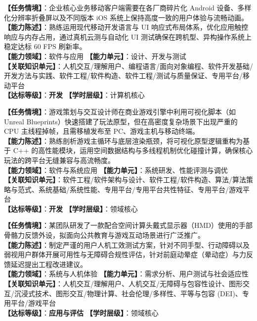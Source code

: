 \begin{taskbox}[任务 2：高一致性多端自适应移动应用设计与实现]
\textbf{【任务情境】}：企业核心业务移动客户端需要在各厂商碎片化 Android 设备、多样化分辨率折叠屏以及不同版本 iOS 系统上保持高度一致的用户体验与流畅动画。\\
\textbf{【能力陈述】}：熟练运用现代移动开发语言与 UI 响应式布局体系，优化应用触控响应与内存占用，通过真机云测与自动化 UI 测试确保在跨机型、异构操作系统上稳定达标 60 FPS 刷新率。\\
\textbf{【能力领域】}：软件与应用 \quad \textbf{【能力单元】}：设计、开发与测试\\
\textbf{【关联知识单元】}：人机交互/理解用户、编程语言/面向对象编程、软件开发基础/开发方法与实践、软件工程/软件构造、软件工程/测试与质量保证、专用平台/移动平台\\
\textbf{【达标等级】}：\textbf{开发} \quad \textbf{【学时层级】}：计算机核心
\end{taskbox}

\begin{taskbox}[任务 3：基于引擎将策划蓝图原型重构为高性能跨平台核心系统]
\textbf{【任务情境】}：游戏策划与交互设计师在商业游戏引擎中利用可视化脚本（如 Unreal Blueprints）快速搭建了玩法原型，但在高密度复杂场景下出现严重的 CPU 主线程掉帧，且需移植发布至 PC、游戏主机与移动终端。\\
\textbf{【能力陈述】}：熟练剖析游戏主循环与底层渲染瓶颈，将可视化原型逻辑重构为基于 C++ 的高性能模块，运用空间数据结构与多线程机制优化碰撞计算，确保核心玩法的跨平台无缝兼容与高流畅度。\\
\textbf{【能力领域】}：软件与系统应用 \quad \textbf{【能力单元】}：系统研发、性能评测与调优\\
\textbf{【关联知识单元】}：软件工程/软件架构与设计、软件工程/软件构造、算法/算法策略与范式、系统基础/系统性能、专用平台/专用平台共性特征、专用平台/游戏平台\\
\textbf{【达标等级】}：\textbf{开发} \quad \textbf{【学时层级】}：领域核心
\end{taskbox}

\begin{taskbox}
\textbf{【任务情境】}：某团队研发了一款配合空间计算头戴式显示器（HMD）使用的手部骨骼力反馈外设，拟面向公共教育与游戏互动场景进行广泛推广。\\
\textbf{【能力陈述】}：制定严谨的用户人机工效测试方案，针对不同手型、行动障碍以及弱视用户群体开展可用性与无障碍合规性评估，针对前庭动晕症（晕动症）与力反馈延迟提出工程改进建议。\\
\textbf{【能力领域】}：系统与人机体验 \quad \textbf{【能力单元】}：需求分析、用户测试与社会适应性\\
\textbf{【关联知识单元】}：人机交互/理解用户、人机交互/无障碍与包容性设计、图形交互/沉浸式技术、图形交互/物理计算、社会伦理/多样性、平等与包容 (DEI)、专用平台/游戏平台\\
\textbf{【达标等级】}：\textbf{应用与评估} \quad \textbf{【学时层级】}：领域核心
\end{taskbox}

